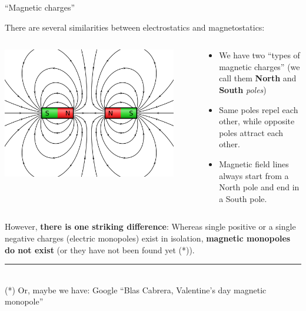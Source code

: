 \begin{frame}{``Magnetic charges''}

There are several similarities between electrostatics and magnetostatics:\\

\begin{columns}
  \begin{column}{0.40\textwidth}
    \begin{center}
      \includegraphics[width=0.90\textwidth]{./images/schematics/magnetic_field_lines_01.png}\\
    \end{center}
  \end{column}
  \begin{column}{0.60\textwidth}

\begin{itemize}
   \item We have two ``types of magnetic charges''
             (we call them {\bf North} and {\bf South} {\em poles})
   \item Same poles repel each other, while opposite poles attract each other.
   \item Magnetic field lines always start from a North pole and end in a South pole.
\end{itemize}

  \end{column}
\end{columns}

\vspace{0.3cm}

However, {\bf there is one striking difference}:
\vspace{0.1cm}
Whereas single positive or a single negative charges (electric monopoles) exist in isolation,
{\bf magnetic monopoles do not exist} (or they have not been found yet (*)).\\

\noindent\rule{2cm}{0.4pt}\\
{\scriptsize
 (*) Or, maybe we have: Google ``Blas Cabrera, Valentine's day magnetic monopole''\\
}

\end{frame}


